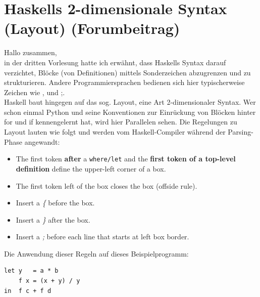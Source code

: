 \documentclass{article}
\newcommand{\Haskell}[1]{\texttt{#1}}
\begin{document}
\section*{Haskells 2-dimensionale Syntax (Layout) (Forumbeitrag)}
\begin{mdframed}
Hallo zusammen,\\
in der dritten Vorlesung hatte ich erwähnt, dass Haskells Syntax darauf verzichtet, Blöcke (von Definitionen) mittels Sonderzeichen abzugrenzen und zu strukturieren. 
Andere Programmiersprachen bedienen sich hier typischerweise Zeichen wie {, } und ;.\\
Haskell baut hingegen auf das sog. Layout, eine Art 2-dimensionaler Syntax.  Wer schon einmal Python und seine Konventionen zur Einrückung von Blöcken hinter for und if kennengelernt hat, wird hier Parallelen sehen. 
Die Regelungen zu Layout lauten wie folgt und werden vom Haskell-Compiler während der Parsing-Phase angewandt:
\begin{itemize}
\item The first token \textbf{after} a \Haskell{where/let} and the \textbf{first token of a top-level definition} define the upper-left corner of a box.
\item The first token left of the box closes the box (offside rule).
\item Insert a \textit{\{} before the box.
\item Insert a \textit{\}} after the box.
\item Insert a \textit{;} before each line that starts at left box border.
\end{itemize}
Die Anwendung dieser Regeln auf dieses Beispielprogramm:
\begin{verbatim}
let y   = a * b       
    f x = (x + y) / y 
in  f c + f d
\end{verbatim}


\end{mdframed}
\end{document}
